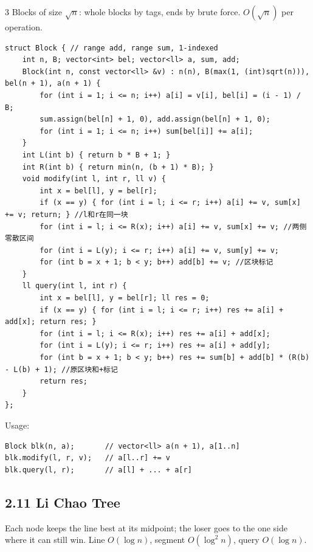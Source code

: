 \documentclass[8pt]{extarticle}
\begin{document}
\begin{multicols*}{3}
Blocks of size $\sqrt n$: whole blocks by tags, ends by brute force. $O(\sqrt n)$ per operation.

\begin{lstlisting}
struct Block { // range add, range sum, 1-indexed
    int n, B; vector<int> bel; vector<ll> a, sum, add;
    Block(int n, const vector<ll> &v) : n(n), B(max(1, (int)sqrt(n))), bel(n + 1), a(n + 1) {
        for (int i = 1; i <= n; i++) a[i] = v[i], bel[i] = (i - 1) / B;
        sum.assign(bel[n] + 1, 0), add.assign(bel[n] + 1, 0);
        for (int i = 1; i <= n; i++) sum[bel[i]] += a[i];
    }
    int L(int b) { return b * B + 1; }
    int R(int b) { return min(n, (b + 1) * B); }
    void modify(int l, int r, ll v) {
        int x = bel[l], y = bel[r];
        if (x == y) { for (int i = l; i <= r; i++) a[i] += v, sum[x] += v; return; } //l和r在同一块
        for (int i = l; i <= R(x); i++) a[i] += v, sum[x] += v; //两侧零散区间
        for (int i = L(y); i <= r; i++) a[i] += v, sum[y] += v;
        for (int b = x + 1; b < y; b++) add[b] += v; //区块标记
    }
    ll query(int l, int r) {
        int x = bel[l], y = bel[r]; ll res = 0;
        if (x == y) { for (int i = l; i <= r; i++) res += a[i] + add[x]; return res; }
        for (int i = l; i <= R(x); i++) res += a[i] + add[x];
        for (int i = L(y); i <= r; i++) res += a[i] + add[y];
        for (int b = x + 1; b < y; b++) res += sum[b] + add[b] * (R(b) - L(b) + 1); //原区块和+标记
        return res;
    }
};
\end{lstlisting}

Usage:

\begin{lstlisting}
Block blk(n, a);       // vector<ll> a(n + 1), a[1..n]
blk.modify(l, r, v);   // a[l..r] += v
blk.query(l, r);       // a[l] + ... + a[r]
\end{lstlisting}

\subsection*{2.11 Li Chao Tree}

Each node keeps the line best at its midpoint; the loser goes to the one side where it can still win. Line $O(\log n)$, segment $O(\log^2 n)$, query $O(\log n)$.


\end{multicols*}
\end{document}
